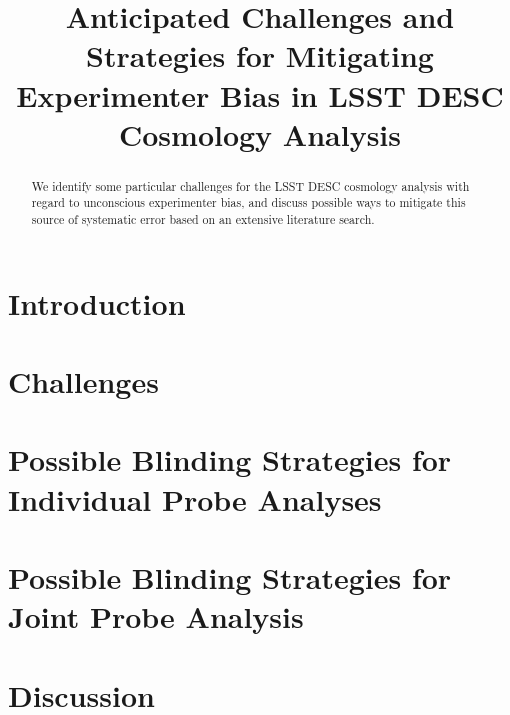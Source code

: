\documentclass[\docopts]{\docclass}
\begin{document}
\title{ Anticipated Challenges and Strategies for Mitigating Experimenter Bias in LSST DESC Cosmology Analysis }

\maketitlepre

\begin{abstract}

We identify some particular challenges for the LSST DESC cosmology analysis with regard to unconscious experimenter bias, and discuss possible ways to mitigate this source of systematic error based on an extensive literature search.

\end{abstract}


\maketitlepost

%

\section{Introduction}
\label{sec:intro}



\section{Challenges}
\label{sec:challenges}



\section{Possible Blinding Strategies for Individual Probe Analyses}
\label{sec:indi}



\section{Possible Blinding Strategies for Joint Probe Analysis}
\label{sec:joint}



\section{Discussion}
\label{sec:discussion}
\end{document}
